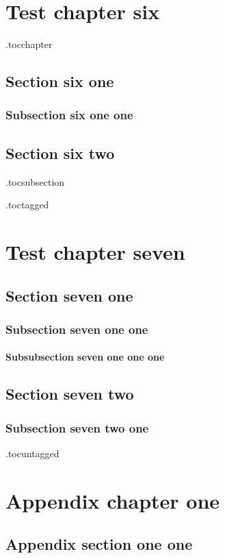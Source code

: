 \documentclass{book}
\begin{document}
\chapter{Test chapter six}
\etocsettocdepth.toc{chapter}
\localtableofcontents %
\section{Section six one}
\subsection{Subsection six one one}
\section{Section six two}
\etocsettocdepth.toc{subsection}

\etocdepthtag.toc{tagged}
\chapter{Test chapter seven}
\section{Section seven one}
\subsection{Subsection seven one one}
\subsubsection{Subsubsection seven one one one}
\section{Section seven two}
\subsection{Subsection seven two one}
\etocdepthtag.toc{untagged}

\appendix

\chapter{Appendix chapter one}
\localtableofcontents
\section{Appendix section one one}
\end{document}
